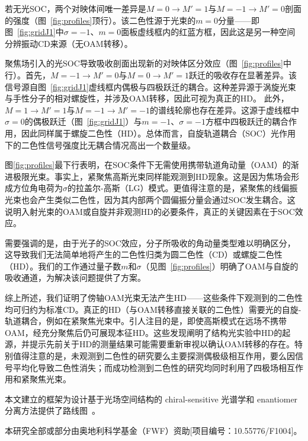 \documentclass[reprint,aps,prl,twocolumn,superscriptaddress,groupedaddress]{revtex4-2}
\begin{document}
若无光SOC，两个对映体间唯一差异是$M=0\to M'=1$与$M=-1\to M'=0$剖面的强度（图~\ref{fig:profiles}顶行）。该二色性源于光束的$m=0$分量——即图~\ref{fig:gridJ1}中$\sigma=-1$、$m=0$面板虚线框内的红蓝方框，因此这是另一种空间分辨振动CD来源（无OAM转移）。

聚焦场引入的光SOC导致吸收剖面出现新的对映体区分效应（图~\ref{fig:profiles}中行）。首先，$M=-1\to M'=0$与$M=0\to M'=1$跃迁的吸收存在显著差异。该信号源自图~\ref{fig:gridJ1}虚线框内偶极与四极跃迁的耦合。这种差异源于涡旋光束与手性分子的相对螺旋性，并涉及OAM转移，因此可视为真正的HD。
此外，$M=1\to M'=1$与$M=-1\to M'=-1$的谱线轮廓也存在差异。这源于虚线框中$\sigma=0$的偶极跃迁（图~\ref{fig:gridJ1}）与$m=-1$、$\sigma=-1$方框中四极跃迁的耦合作用，因此同样属于螺旋二色性（HD）。总体而言，自旋轨道耦合（SOC）光作用下的二色性信号强度比无耦合情况高出一个数量级。

图\ref{fig:profiles}最下行表明，在SOC条件下无需使用携带轨道角动量（OAM）的渐进极限光束。事实上，紧聚焦高斯光束同样能观测到HD现象。这是因为焦场会形成方位角电荷为$\sigma$的拉盖尔-高斯（LG）模式。更值得注意的是，紧聚焦的线偏振光束也会产生类似二色性，因为其内部两个圆偏振分量会通过SOC发生耦合。这说明入射光束的OAM或自旋并非观测HD的必要条件，真正的关键因素在于SOC效应。

需要强调的是，由于光子的SOC效应，分子所吸收的角动量类型难以明确区分，这导致我们无法简单地将产生的二色性归类为圆二色性（CD）或螺旋二色性（HD）。我们的工作通过量子数$m$和$\sigma$（见图~\ref{fig:profiles}）明确了OAM与自旋的吸收通道，为解决该问题提供了方案。

综上所述，我们证明了傍轴OAM光束无法产生HD——这些条件下观测到的二色性均可归约为标准CD。真正的HD（与OAM转移直接关联的二色性）需要光的自旋-轨道耦合，例如在紧聚焦光束中。引人注目的是，即使高斯模式在远场不携带OAM，经充分聚焦后仍可展现本征HD。这些发现阐明了结构光实验中HD的起源，并提示先前关于HD的测量结果可能需要重新审视以确认OAM转移的存在。特别值得注意的是，未观测到二色性的研究要么主要探测偶极级相互作用\cite{Araoka2005}，要么因信号平均化导致二色性消失\cite{Loeffler2011}；而成功检测到二色性的研究均同时利用了四极场相互作用和紧聚焦光束\cite{Rusak2019,Rouxel2022,Begin2023,Jain2023}。

本文建立的框架为设计基于光场空间结构的 chiral-sensitive 光谱学和 enantiomer 分离方法提供了路线图~\cite{Leibscher2022}。\\
\begin{acknowledgments}
本研究全部或部分由奥地利科学基金（FWF）资助[项目编号：10.55776/F1004]。
\end{acknowledgments}

\end{document}
